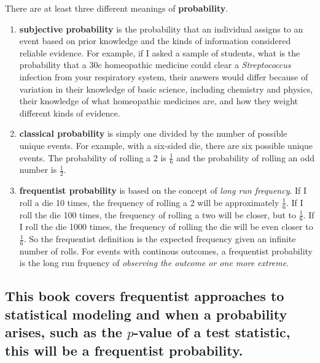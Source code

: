 \documentclass[]{book}
\theoremstyle{definition}
\theoremstyle{definition}
\theoremstyle{definition}
\theoremstyle{remark}
\begin{document}
There are at least three different meanings of \textbf{probability}.

\begin{enumerate}
\def\labelenumi{\arabic{enumi}.}
\item
  \textbf{subjective probability} is the probability that an individual
  assigns to an event based on prior knowledge and the kinds of
  information considered reliable evidence. For example, if I asked a
  sample of students, what is the probability that a 30c homeopathic
  medicine could clear a \emph{Streptococcus} infection from your
  respiratory system, their answers would differ because of variation in
  their knowledge of basic science, including chemistry and physics,
  their knowledge of what homeopathic medicines are, and how they weight
  different kinds of evidence.
\item
  \textbf{classical probability} is simply one divided by the number of
  possible unique events. For example, with a six-sided die, there are
  six possible unique events. The probability of rolling a 2 is
  \(\frac{1}{6}\) and the probability of rolling an odd number is
  \(\frac{1}{2}\).
\item
  \textbf{frequentist probability} is based on the concept of
  \textit{long run frequency}. If I roll a die 10 times, the frequency
  of rolling a 2 will be approximately \(\frac{1}{6}\). If I roll the
  die 100 times, the frequency of rolling a two will be closer, but to
  \(\frac{1}{6}\). If I roll the die 1000 times, the frequency of
  rolling the die will be even closer to \(\frac{1}{6}\). So the
  frequentist definition is the expected frequency given an infinite
  number of rolls. For events with continous outcomes, a frequentist
  probability is the long run frquency of \emph{observing the outcome or
  one more extreme}.
\end{enumerate}

\subsection{\texorpdfstring{This book covers frequentist approaches to
statistical modeling and when a probability arises, such as the
\(p\)-value of a test statistic, this will be a frequentist
probability.}{This book covers frequentist approaches to statistical modeling and when a probability arises, such as the p-value of a test statistic, this will be a frequentist probability.}}\label{this-book-covers-frequentist-approaches-to-statistical-modeling-and-when-a-probability-arises-such-as-the-p-value-of-a-test-statistic-this-will-be-a-frequentist-probability.}
\end{document}
